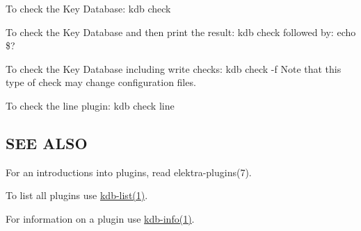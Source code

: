 To check the Key Database\+: {\ttfamily kdb check}

To check the Key Database and then print the result\+: {\ttfamily kdb check} followed by\+: {\ttfamily echo \$?}

To check the Key Database including write checks\+: {\ttfamily kdb check -\/f} Note that this type of check may change configuration files.

To check the {\ttfamily line} plugin\+: {\ttfamily kdb check line}

\subsection*{S\+E\+E A\+L\+S\+O}


\begin{DoxyItemize}
\item For an introductions into plugins, read elektra-\/plugins(7).
\item To list all plugins use \hyperlink{md_doc_help_kdb-list_doc_help_kdb-list_md}{kdb-\/list(1)}.
\item For information on a plugin use \hyperlink{md_doc_help_kdb-info_doc_help_kdb-info_md}{kdb-\/info(1)}. 
\end{DoxyItemize}